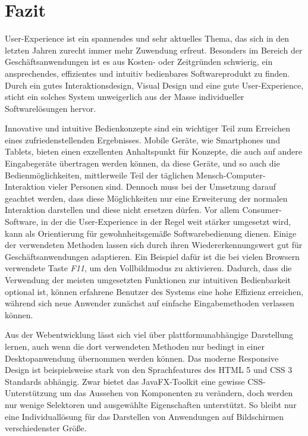 \section{Fazit}
User-Experience ist ein spannendes und sehr aktuelles Thema, das sich in den letzten Jahren zurecht immer mehr Zuwendung erfreut. Besonders im Bereich der Geschäftsanwendungen ist es aus Kosten- oder Zeitgründen schwierig, ein ansprechendes, effizientes und intuitiv bedienbares Softwareprodukt zu finden. Durch ein gutes Interaktionsdesign, Visual Design und eine gute User-Experience, sticht ein solches System unweigerlich aus der Masse individueller Softwarelösungen hervor.\par
Innovative und intuitive Bedienkonzepte sind ein wichtiger Teil zum Erreichen eines zufriedenstellenden Ergebnisses. Mobile Geräte, wie Smartphones und Tablets, bieten einen exzellenten Anhaltspunkt für Konzepte, die auch auf andere Eingabegeräte übertragen werden können, da diese Geräte, und so auch die Bedienmöglichkeiten, mittlerweile Teil der täglichen Mensch-Computer-Interaktion vieler Personen sind. Dennoch muss bei der Umsetzung darauf geachtet werden, dass diese Möglichkeiten nur eine Erweiterung der normalen Interaktion darstellen und diese nicht ersetzen dürfen. Vor allem Consumer-Software, in der die User-Experience in der Regel weit stärker umgesetzt wird, kann als Orientierung für gewohnheitsgemäße Softwarebedienung dienen. Einige der verwendeten Methoden lassen sich durch ihren Wiedererkennungswert gut für Geschäftsanwendungen adaptieren. Ein Beispiel dafür ist die bei vielen Browsern verwendete Taste \textit{F11}, um den Vollbildmodus zu aktivieren. Dadurch, dass die Verwendung der meisten umgesetzten Funktionen zur intuitiven Bedienbarkeit optional ist, können erfahrene Benutzer des Systems eine hohe Effizienz erreichen, während sich neue Anwender zunächst auf einfache Eingabemethoden verlassen können.\par
Aus der Webentwicklung lässt sich viel über plattformunabhängige Darstellung lernen, auch wenn die dort verwendeten Methoden nur bedingt in einer Desktopanwendung übernommen werden können. Das moderne Responsive Design ist beispielsweise stark von den Sprachfeatures des HTML 5 und CSS 3 Standards abhängig. Zwar bietet das JavaFX-Toolkit eine gewisse CSS-Unterstützung um das Aussehen von Komponenten zu verändern, doch werden nur wenige Selektoren und ausgewählte Eigenschaften unterstützt. So bleibt nur eine Individuallösung für das Darstellen von Anwendungen auf Bildschirmen verschiedenster Größe.\par
